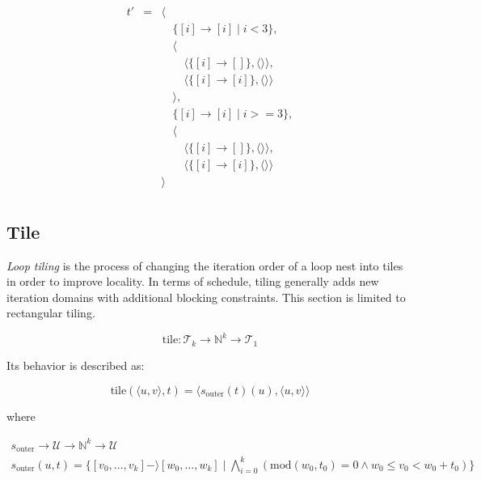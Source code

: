 \documentclass{article}
\begin{document}
\[
    \begin{array}{lcl}
        t'&=& \langle \\
          & & \quad\{[i] \rightarrow [i] \mid i < 3 \},\\
          & & \quad\langle \\
          & & \quad\quad \langle\{ [i] \rightarrow [] \}, \langle\rangle\rangle,\\
          & & \quad\quad \langle\{ [i] \rightarrow [i] \}, \langle\rangle\rangle\\
          & & \quad\rangle, \\
          & & \quad\{[i] \rightarrow [i] \mid i >= 3 \},\\
          & & \quad\langle \\
          & & \quad\quad \langle\{ [i] \rightarrow [] \}, \langle\rangle\rangle,\\
          & & \quad\quad \langle\{ [i] \rightarrow [i] \}, \langle\rangle\rangle\\
          & & \rangle \\
    \end{array}
\]

\subsection{Tile}

\emph{Loop tiling} is the process of changing the iteration order of a loop
nest into tiles in order to improve locality. In terms of schedule, tiling
generally adds new iteration domains with additional blocking constraints. This
section is limited to rectangular tiling.

\[
    \mathrm{tile}: \mathcal{T}_k \rightarrow \mathbb{N}^k \rightarrow \mathcal{T}_1
\]

Its behavior is described as:

\[
    \mathrm{tile}(\langle u, v\rangle, t) = \langle  s_\mathrm{outer}(t)(u), \langle  u, v \rangle \rangle
\]

\noindent where

\[
    \begin{array}{l}
        s_\mathrm{outer} \rightarrow \mathcal{U} \rightarrow \mathbb{N}^k \rightarrow \mathcal{U} \\
    s_\mathrm{outer}(u, t) = \{ [v_0, \ldots, v_k] -\rangle [w_0, \ldots, w_k] \mid \bigwedge_{i=0}^k(\mathrm{mod}(w_0, t_0) = 0 \wedge w_0 \le v_0 < w_0 + t_0) \}
    \end{array}
\]
\end{document}
